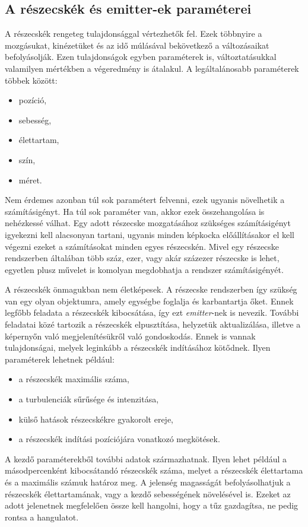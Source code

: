 \subsection{A részecskék és emitter-ek paraméterei}
A részecskék rengeteg tulajdonsággal vértezhetők fel. Ezek többnyire a mozgásukat, kinézetüket és az idő múlásával bekövetkező a változásaikat befolyásolják. Ezen tulajdonságok egyben paraméterek is, változtatásukkal valamilyen mértékben a végeredmény is átalakul. A legáltalánosabb paraméterek többek között:
\begin{itemize}
\item pozíció, 
\item sebesség, 
\item élettartam, 
\item szín, 
\item méret. 
\end{itemize}
Nem érdemes azonban túl sok paramétert felvenni, ezek ugyanis növelhetik a számításigényt. Ha túl sok paraméter van, akkor ezek összehangolása is nehézkessé válhat. Egy adott részecske mozgatásához szükséges számításigényt igyekezni kell alacsonyan tartani, ugyanis minden képkocka előállításakor el kell végezni ezeket a számításokat minden egyes részecskén. Mivel egy részecske rendszerben általában több száz, ezer, vagy akár százezer részecske is lehet, egyetlen plusz művelet is komolyan megdobhatja a rendszer számításigényét.

A részecskék önmagukban nem életképesek. A részecske rendszerben így szükség van egy olyan objektumra, amely egységbe foglalja és karbantartja őket. Ennek  legfőbb feladata a részecskék kibocsátása, így ezt \textit{emitter}-nek is nevezik. További feladatai közé tartozik a részecskék elpusztítása, helyzetük aktualizálása, illetve a képernyőn való megjelenítésükről való gondoskodás. Ennek is vannak tulajdonságai, melyek leginkább a részecskék indításához kötődnek. Ilyen paraméterek lehetnek például:
\begin{itemize}
\item a részecskék maximális száma, 
\item a turbulenciák sűrűsége és intenzitása, 
\item külső hatások részecskékre gyakorolt ereje, 
\item a részecskék indítási pozíciójára vonatkozó megkötések.
\end{itemize}

A kezdő paraméterekből további adatok származhatnak. Ilyen lehet például a másodpercenként kibocsátandó részecskék száma, melyet a részecskék élettartama és a maximális számuk határoz meg. A jelenség magasságát befolyásolhatjuk a részecskék élettartamának, vagy a kezdő sebességének növelésével is. Ezeket az adott jelenetnek megfelelően össze kell hangolni, hogy a tűz gazdagítsa, ne pedig rontsa a hangulatot.

